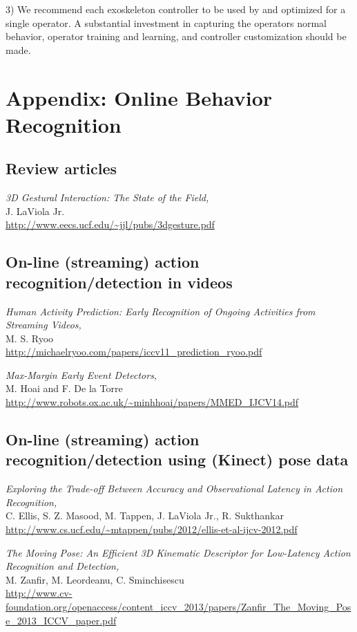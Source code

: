 \documentclass[letterpaper,12pt,fullpage]{article}
\begin{document}
3) We recommend each exoskeleton controller
to be used by and optimized for a single operator.
A substantial investment in capturing the operators normal behavior,
operator training and learning, and controller customization should be made.

\section{Appendix: Online Behavior Recognition}

\subsection{Review articles}

{\it 3D Gestural Interaction: The State of the Field,}\\
J. LaViola Jr.\\
\url{http://www.eecs.ucf.edu/~jjl/pubs/3dgesture.pdf}

\subsection{On-line (streaming) action recognition/detection in videos}

{\it Human Activity Prediction: Early Recognition of Ongoing Activities
from Streaming Videos,}\\
M. S. Ryoo\\
\url{http://michaelryoo.com/papers/iccv11_prediction_ryoo.pdf}

{\it Max-Margin Early Event Detectors,}\\
M. Hoai and F. De la Torre\\
\url{http://www.robots.ox.ac.uk/~minhhoai/papers/MMED_IJCV14.pdf}

\subsection{On-line (streaming) action recognition/detection using (Kinect) pose data}

{\it Exploring the Trade-off Between Accuracy and Observational Latency in
Action Recognition,}\\
C. Ellis, S. Z. Masood, M. Tappen, J. LaViola Jr., R. Sukthankar\\
\url{http://www.cs.ucf.edu/~mtappen/pubs/2012/ellis-et-al-ijcv-2012.pdf}

{\it The Moving Pose: An Efficient 3D Kinematic Descriptor for Low-Latency
Action Recognition and Detection,}\\
M. Zanfir, M. Leordeanu, C. Sminchisescu\\
\url{http://www.cv-foundation.org/openaccess/content_iccv_2013/papers/Zanfir_The_Moving_Pose_2013_ICCV_paper.pdf}
\end{document}
